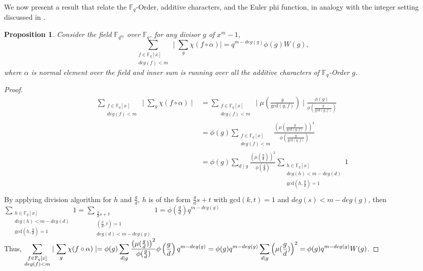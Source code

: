 \documentclass[12pt,a4paper]{article}
\theoremstyle{plain}
\newtheorem{prop}[thm]{Proposition}
\theoremstyle{definition}
\numberwithin{equation}{section}
\begin{document}
    We now present a result that relate the \(\mathbb{F}_q\)-Order, additive characters, and the Euler phi function, in analogy with the integer setting discussed in \cite{Laishram_AP}.
    \begin{prop}
        Consider the field $\mathbb{F}_{q^m}$ over $\mathbb{F}_q$, for any divisor $g$ of $x^m-1$, $$\displaystyle \sum_{\substack{f \in \mathbb{F}_q[x] \\ deg(f) < m}} \mid \sum_g \chi(f \circ \alpha) \mid = q^{m-deg(g)}\phi(g) W(g),$$
        where $\alpha$ is normal element over the field and inner sum is running over all the additive characters of $\mathbb{F}_q$-Order $g$.
    \end{prop}
    \begin{proof}
        \begin{align*}
             \displaystyle \sum_{\substack{f \in \mathbb{F}_q[x] \\ deg(f) < m}} \mid \sum_g \chi(f \circ \alpha) \mid 
             &= \sum_{\substack{f \in \mathbb{F}_q[x] \\ deg(f) < m}} \mid \mu(\frac{g}{\text{gcd}(g,f)})\mid \frac{\phi(g)}{\phi(\frac{g}{\text{gcd}(g,f)})}\\
             &= \phi(g) \sum_{\substack{f \in \mathbb{F}_q[x] \\ deg(f) < m}} \frac{\left (\mu(\frac{g}{\text{gcd}(g,f)})\right)^2}{\phi(\frac{g}{\text{gcd}(g,f)})}\\
             &= \phi(g)\sum_{d \mid g} \frac{\left( \mu(\frac{g}{d}) \right)^2}{\phi(\frac{g}{d})} \sum_{\substack{h \in \mathbb{F}_q[x]\\ deg(h)<m-deg(d) \\ \text{gcd}(h,\frac{g}{d})=1 }} 1 \\
         \end{align*}
         By applying division algorithm for $h$ and $\frac{g}{d}$, $h$ is of the form $\frac{g}{d}s + t$ with $\text{gcd}(k,t) = 1$ and $deg(s) < m-deg(g)$, then \\
         $\displaystyle \sum_{\substack{h \in \mathbb{F}_q[x]\\ deg(h)<m-deg(d) \\ \text{gcd}(h,\frac{g}{d})=1 }} 1 = \sum_{\substack{\frac{g}{d}s+t \\ (\frac{g}{d},t) = 1 \\ deg(d) < m- deg(g)}} 1 = \phi\left(\frac{g}{d}\right)q^{m-deg(g)}$\\
         Thus, $\displaystyle \sum_{\substack{f \in \mathbb{F}_q[x] \\ deg(f) < m}} \mid \sum_g \chi(f \circ \alpha) \mid =  \phi(g) \sum_{d \mid g} \frac{\left( \mu(\frac{g}{d}) \right)^2}{\phi(\frac{g}{d})} \phi\left(\frac{g}{d}\right)q^{m-deg(g)}\\ = \phi(g)q^{m-deg(g)} \sum_{d \mid g} \left( \mu(\frac{g}{d}) \right)^2 = \phi(g) q^{m-deg(g)} W(g)$.
    \end{proof}
\end{document}
